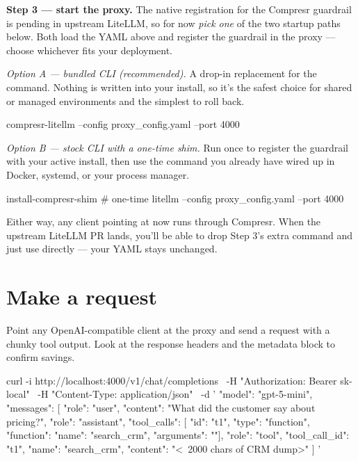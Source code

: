 \documentclass[10pt]{article}
\begin{document}
\textbf{Step 3 — start the proxy.} The native registration for the Compresr
guardrail is pending in upstream LiteLLM, so for now \emph{pick one} of the
two startup paths below. Both load the YAML above and register the guardrail
in the proxy — choose whichever fits your deployment.

\textit{Option A — bundled  CLI
(recommended).} A drop-in replacement for the 
command. Nothing is written into your  install, so
it's the safest choice for shared or managed environments and the simplest
to roll back.

\begin{shcode}
compresr-litellm --config proxy_config.yaml --port 4000
\end{shcode}

\textit{Option B — stock  CLI with a one-time shim.}
Run  once to register the guardrail
with your active  install, then use the
 command you already have wired up in Docker,
systemd, or your process manager.

\begin{shcode}
install-compresr-shim                  # one-time
litellm --config proxy_config.yaml --port 4000
\end{shcode}

Either way, any client pointing at 
now runs through Compresr. When the upstream LiteLLM PR lands, you'll be
able to drop Step 3's extra command and just use 
directly — your YAML stays unchanged.

\section{Make a request}

Point any OpenAI-compatible client at the proxy and send a request with a
chunky tool output. Look at the response headers and the metadata block to
confirm savings.

\begin{shcode}
curl -i http://localhost:4000/v1/chat/completions \
  -H "Authorization: Bearer sk-local" \
  -H "Content-Type: application/json" \
  -d '{
    "model": "gpt-5-mini",
    "messages": [
      {"role": "user", "content": "What did the customer say about pricing?"},
      {"role": "assistant", "tool_calls": [
        {"id": "t1", "type": "function",
         "function": {"name": "search_crm", "arguments": "{}"}}]},
      {"role": "tool", "tool_call_id": "t1", "name": "search_crm",
       "content": "<~2000 chars of CRM dump>"}
    ]
  }'
\end{shcode}
\end{document}
